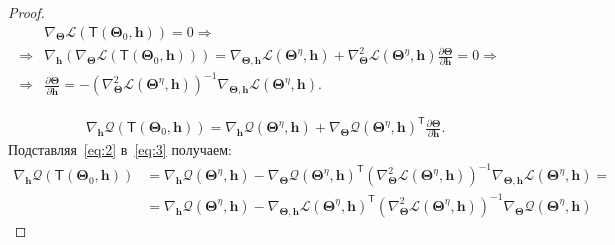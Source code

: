 \documentclass[12pt, twoside]{article}
\begin{document}
\begin{proof}

\begin{equation}
\label{eq:2}
	\begin{aligned}
		&\nabla_{\bm{\Theta}}\mathcal{L}\left(\mathsf{T}\left(\bm{\Theta}_{0}, \mathbf{h}\right)\right) = 0 \Rightarrow\\
		\Rightarrow&\nabla_{\mathbf{h}}\left(\nabla_{\bm{\Theta}}\mathcal{L}\left(\mathsf{T}\left(\bm{\Theta}_{0}, \mathbf{h}\right)\right)\right) = \nabla_{\bm{\Theta}, \mathbf{h}}\mathcal{L}\left(\bm{\Theta}^{\eta}, \mathbf{h}\right) + \nabla_{\bm{\Theta}}^{2}\mathcal{L}\left(\bm{\Theta}^{\eta}, \mathbf{h}\right)\frac{\partial \bm{\Theta}}{\partial \mathbf{h}} = 0 \Rightarrow \\
		\Rightarrow&\frac{\partial \bm{\Theta}}{\partial \mathbf{h}} = -\left(\nabla_{\bm{\Theta}}^{2}\mathcal{L}\left(\bm{\Theta}^{\eta}, \mathbf{h}\right)\right)^{-1}\nabla_{\bm{\Theta}, \mathbf{h}}\mathcal{L}\left(\bm{\Theta}^{\eta}, \mathbf{h}\right).
 	\end{aligned}
\end{equation}

\begin{equation}
\label{eq:3}
	\begin{aligned}
		&\nabla_{\mathbf{h}}\mathcal{Q}\left(\mathsf{T}\left(\bm{\Theta}_{0}, \mathbf{h}\right)\right) = \nabla_{\mathbf{h}}\mathcal{Q}\left(\bm{\Theta}^{\eta}, \mathbf{h}\right)+\nabla_{\bm{\Theta}}\mathcal{Q}\left(\bm{\Theta}^{\eta}, \mathbf{h}\right)^{\mathsf{T}}\frac{\partial \bm{\Theta}}{\partial \mathbf{h}}.
 	\end{aligned}
\end{equation}
Подставляя~\eqref{eq:2} в~\eqref{eq:3} получаем:
\begin{equation}
\label{eq:4}
	\begin{aligned}
		\nabla_{\mathbf{h}}\mathcal{Q}\left(\mathsf{T}\left(\bm{\Theta}_{0}, \mathbf{h}\right)\right) &= \nabla_{\mathbf{h}}\mathcal{Q}\left(\bm{\Theta}^{\eta}, \mathbf{h}\right) - \nabla_{\bm{\Theta}}\mathcal{Q}\left(\bm{\Theta}^{\eta}, \mathbf{h}\right)^{\mathsf{T}}\left(\nabla_{\bm{\Theta}}^{2}\mathcal{L}\left(\bm{\Theta}^{\eta}, \mathbf{h}\right)\right)^{-1}\nabla_{\bm{\Theta}, \mathbf{h}}\mathcal{L}\left(\bm{\Theta}^{\eta}, \mathbf{h}\right) = \\
		&= \nabla_{\mathbf{h}}\mathcal{Q}\left(\bm{\Theta}^{\eta}, \mathbf{h}\right) -  \nabla_{\bm{\Theta}, \mathbf{h}}\mathcal{L}\left(\bm{\Theta}^{\eta}, \mathbf{h}\right)^{\mathsf{T}}\left(\nabla_{\bm{\Theta}}^{2}\mathcal{L}\left(\bm{\Theta}^{\eta}, \mathbf{h}\right)\right)^{-1}\nabla_{\bm{\Theta}}\mathcal{Q}\left(\bm{\Theta}^{\eta}, \mathbf{h}\right)   
 	\end{aligned}
\end{equation}
\end{proof}
\end{document}
